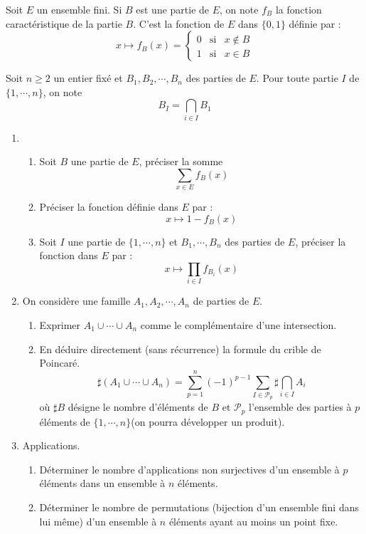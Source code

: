 Soit $E$ un ensemble fini. Si $B$ est une partie de $E$, on note $f_B$ la fonction caractéristique de la partie $B$. C'est la fonction de $E$ dans $\{0,1\}$ définie par :
\[x \mapsto f_B(x)=\left\lbrace \begin{array}{ccc}
0 & \mathrm{si} & x \not \in B\\
1 & \mathrm{si} & x\in B
\end{array} \right. \]

Soit $n \geq 2$ un entier fixé et $B_1,B_2,\cdots , B_n$ des parties de $E$. Pour toute partie $I$ de $\{1,\cdots, n\}$, on note
\[B_I=\bigcap_{i\in I}B_1\]

\begin{enumerate}
\item \begin{enumerate}
\item Soit $B$ une partie de $E$, préciser la somme
\[\sum_{x \in E} f_B(x)\]
\item Préciser la fonction définie dans $E$ par :
\[x \mapsto 1-f_B(x)\]
\item Soit $I$ une partie de $\{1,\cdots,n\}$ et $B_1,\cdots,B_n$ des parties de $E$, préciser la fonction  dans $E$ par :
\[x\mapsto \prod _{i\in I}f_{B_i}(x)\]
\end{enumerate}
\item On considère une famille $A_1,A_2, \cdots , A_n$ de parties de $E$.\begin{enumerate}
\item Exprimer $A_1 \cup \cdots \cup A_n$ comme le complémentaire d'une intersection.
\item En déduire directement (sans récurrence) la formule du crible de Poincaré.
\[\sharp(A_1 \cup \cdots \cup A_n)=\sum_{p=1}^n(-1)^{p-1}\sum _{I\in \mathcal{P}_p}\sharp \bigcap_{i\in I} A_i\]
où $\sharp B$ désigne le nombre d'éléments de $B$ et $\mathcal{P}_p$ l'ensemble des parties à $p$ éléments de $\{1,\cdots ,n\}$(on pourra développer un produit).
\end{enumerate}
\item Applications.
\begin{enumerate}
 \item Déterminer le nombre d'applications non surjectives d'un ensemble à $p$ éléments dans un ensemble à $n$ éléments.
\item Déterminer le nombre de permutations (bijection d'un ensemble fini dans lui même) d'un ensemble à $n$ éléments ayant au moins un point fixe. 
\end{enumerate}

\end{enumerate}
